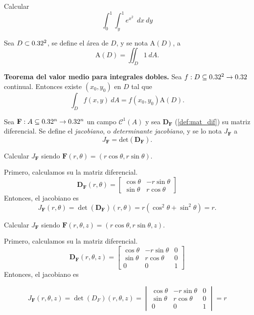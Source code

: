 \begin{tarea}Calcular  $$ \int_{0}^{1}\int_{y}^{1} e^{x^{2}} \:\: dx\:dy $$
\end{tarea}



\begin{definition}  Sea $D\subset0.32^2$,  se define el \'area de $D$,  y se nota $\text{A}(D)$,  a  
    \[
        \text{A}(D)=\iint_D1\:dA.
    \]
\end{definition}



\begin{theorem}
    \textbf{Teorema del valor medio para integrales dobles.}   Sea $f:D\subseteq0.32^2\to0.32$ continual.  Entonces existe $(x_0,y_0)$ en $D$ tal que
    \[
        \int_D f(x,y)\:dA=f(x_0,y_0)\text{A}(D).
    \]
\end{theorem}

\begin{definition}
    Sea $\mathbf{F}:A\subseteq0.32^n\to0.32^n$ un campo $\mathcal{C}^1(A)$ y sea $\boldsymbol{D}_\mathbf{F}$ (\autoref{def:mat_dif}) su matriz diferencial.  Se define el \emph{jacobiano}, o \emph{determinante jacobiano}, y se lo nota $J_\mathbf{F}$ a 
    \[
        J_\mathbf{F}=\text{det}(\boldsymbol{D}_\mathbf{F}).
    \]
\end{definition}


\begin{example}  Calcular $J_\mathbf{F}$ siendo  \( \mathbf{F}(r, \theta) = (r\cos\theta, r\sin\theta) \).

 Primero, calculamos su la matriz diferencial.
       \[
       \boldsymbol{D}_{\mathbf{F}}(r, \theta) 
       =
       \begin{bmatrix}
       \cos\theta & -r\sin\theta \\
       \sin\theta & r\cos\theta
       \end{bmatrix}
       \]
       Entonces, el jacobiano es
       \[
       J_{\mathbf{F}}(r, \theta) = \det(\boldsymbol{D}_{\mathbf{F}})(r, \theta) = 
      r(\cos^2\theta + \sin^2\theta) = r.
       \]
   \end{example}
   
   \begin{example}  Calcular $J_\mathbf{F}$   siendo   \( \mathbf{F}(r, \theta, z) = (r\cos\theta, r\sin\theta, z) \).
        
  Primero, calculamos su la matriz diferencial.
   \[
    \boldsymbol{D}_{\mathbf{F}} (r, \theta,  z)=
    \begin{bmatrix}
   \cos\theta & -r\sin\theta & 0 \\
   \sin\theta & r\cos\theta & 0 \\
   0 & 0 & 1
   \end{bmatrix}
   \]   
    Entonces, el jacobiano es 
   
   \[
   J_\mathbf{F} (r, \theta, z) = \det(D_F)(r, \theta, z)  = 
   \begin{vmatrix}
   \cos\theta & -r\sin\theta & 0 \\
   \sin\theta & r\cos\theta & 0 \\
   0 & 0 & 1
   \end{vmatrix}
   = r
   \]
   \end{example}
   
